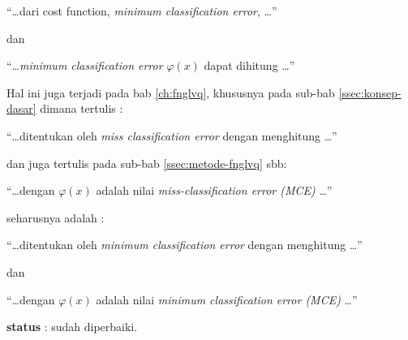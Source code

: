 \begin{enumerate}
 	``\ldots dari cost function, \emph{minimum classification error}, \ldots''
 	
 	dan 
 	
 	``\ldots \emph{minimum classification error} $\varphi(x)$ dapat dihitung
 	\ldots''
 	 
 	Hal ini juga terjadi pada bab \ref{ch:fnglvq}, khususnya pada sub-bab
 	\ref{ssec:konsep-dasar} dimana tertulis :
 	
 	``\ldots ditentukan oleh \emph{miss classification error} dengan menghitung
 	\ldots''
 	
 	dan juga tertulis pada sub-bab \ref{ssec:metode-fnglvq} sbb:
 	
 	``\ldots dengan $\varphi(x)$ adalah nilai \emph{miss-classification error
 	(MCE)} \ldots''
 	
 	seharusnya adalah :
 	
 	``\ldots ditentukan oleh \emph{minimum classification error} dengan
 	menghitung \ldots''
 	
	dan
	
	``\ldots dengan $\varphi(x)$ adalah nilai \emph{minimum classification error
 	(MCE)} \ldots''
	 	
	\textbf{status} : sudah diperbaiki.
\end{enumerate}
